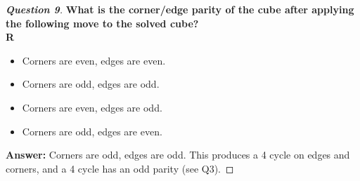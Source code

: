 \documentclass{article}
\begin{document}
\begin{proof}[\textbf{Question 9}]
\textbf{What is the corner/edge parity of the cube after applying the following move to the solved cube?\\
R}
\begin{itemize}
    \item Corners are even, edges are even.
    \item Corners are odd, edges are odd. 
    \item Corners are even, edges are odd. 
    \item Corners are odd, edges are even. 
\end{itemize}
\textbf{Answer:} Corners are odd, edges are odd. This produces a 4 cycle on edges and corners, and a 4 cycle has an odd parity (see Q3).
\end{proof}
\end{document}

